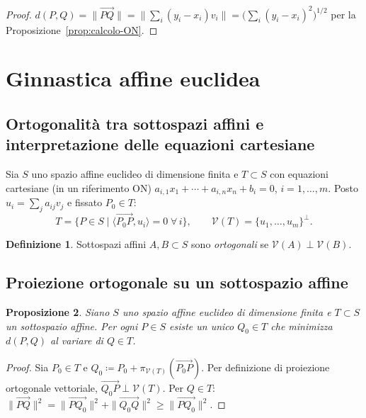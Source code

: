 \documentclass[11pt, a4paper]{book}
\theoremstyle{definition}
\newtheorem{definizione}{Definizione}[section]
\theoremstyle{plain}
\newtheorem{proposizione}[definizione]{Proposizione}
\theoremstyle{remark}
\begin{document}
\begin{proof}
$d(P,Q) = \|\overrightarrow{PQ}\| = \|\sum_i(y_i-x_i)v_i\| = \bigl(\sum_i(y_i-x_i)^2\bigr)^{1/2}$ per la Proposizione~\ref{prop:calcolo-ON}.
\end{proof}

\section{Ginnastica affine euclidea}
\label{sec:ginnastica-affine}

\subsection{Ortogonalità tra sottospazi affini e interpretazione delle equazioni cartesiane}

Sia $S$ uno spazio affine euclideo di dimensione finita e $T \subset S$ con equazioni cartesiane (in un riferimento ON)
$a_{i,1}x_1 + \cdots + a_{i,n}x_n + b_i = 0$, $i=1,\ldots,m$. Posto $u_i = \sum_j a_{ij}v_j$ e fissato $P_0 \in T$:
\[
  T = \{P \in S \mid \langle\overrightarrow{P_0 P},u_i\rangle = 0\;\forall\,i\}, \qquad \mathcal{V}(T) = \{u_1,\ldots,u_m\}^\perp.
\]

\begin{defbox}
\begin{definizione}
Sottospazi affini $A, B \subset S$ sono \emph{ortogonali} se $\mathcal{V}(A) \perp \mathcal{V}(B)$.
\end{definizione}
\end{defbox}

\subsection{Proiezione ortogonale su un sottospazio affine}

\begin{proposizione}
\label{prop:proiezione-affine}
Siano $S$ uno spazio affine euclideo di dimensione finita e $T \subset S$ un sottospazio affine. Per ogni $P \in S$ esiste un unico $Q_0 \in T$ che minimizza $d(P,Q)$ al variare di $Q \in T$.
\end{proposizione}

\begin{proof}
Sia $P_0 \in T$ e $Q_0 \coloneqq P_0 + \pi_{\mathcal{V}(T)}(\overrightarrow{P_0 P})$. Per definizione di proiezione ortogonale vettoriale, $\overrightarrow{Q_0 P} \perp \mathcal{V}(T)$. Per $Q \in T$: $\|\overrightarrow{PQ}\|^2 = \|\overrightarrow{PQ_0}\|^2 + \|\overrightarrow{Q_0 Q}\|^2 \geq \|\overrightarrow{PQ_0}\|^2$.
\end{proof}
\end{document}

